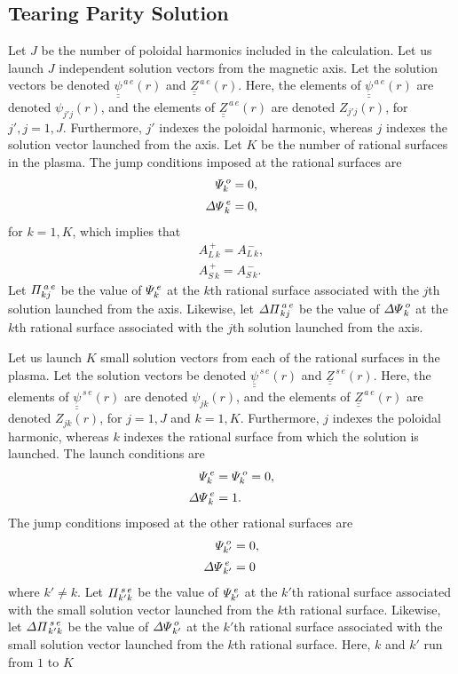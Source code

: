 \documentclass[12pt,prb,aps,notitlepage]{revtex4-1}
\begin{document}
\subsection{Tearing Parity Solution}
Let $J$ be the number of poloidal harmonics included in the calculation. 
Let us launch $J$ independent solution vectors from the magnetic axis.
Let the  solution vectors be denoted $\underline{\underline{\psi}}^{\,a\,e}(r)$ and $\underline{\underline{Z}}^{\,a\,e}(r)$. Here, the elements of $\underline{\underline{\psi}}^{\,a\,e}(r)$ are denoted $\psi_{j'j}(r)$, and the elements of  
$\underline{\underline{Z}}^{\,a\,e}(r)$ are denoted $Z_{j'j}(r)$, for $j',j = 1, J$.  Furthermore, $j'$ indexes the poloidal
harmonic, whereas $j$ indexes the solution vector launched from the axis. Let  $K$ be the number of rational surfaces in the plasma.
The jump conditions imposed at the rational surfaces are
\begin{align}
{\mit\Psi}_k^{\,o} &= 0,\\[0.5ex]
{\mit\Delta\Psi}_k^{\,e} &= 0,
\end{align}
for $k=1,K$, which implies that
\begin{align}
A_{L\,k}^{\,+} = A_{L\,k}^{\,-},\\[0.5ex]
A_{S\,k}^{\,+} = A_{S\,k}^{\,-}.
\end{align}
Let ${\mit\Pi}_{kj}^{\,a\,e}$ be the value of ${\mit\Psi}_{k}^{\,e}$ at the $k$th rational surface associated with the $j$th solution launched from the axis. Likewise, let ${\mit\Delta\Pi}_{kj}^{\,a\,e}$ be the value of ${\mit\Delta\Psi}_{k}^{\,o}$
at the $k$th rational surface  associated with the $j$th solution launched from the axis. 

Let us launch $K$ small solution vectors from each of the  rational surfaces in the plasma. Let the solution vectors  be denoted  $\underline{\underline{\psi}}^{\,s\,e}(r)$ and $\underline{\underline{Z}}^{\,s\,e}(r)$. 
Here, the elements of $\underline{\underline{\psi}}^{\,s\,e}(r)$ are  denoted $\psi_{jk}(r)$, and the elements of  
$\underline{\underline{Z}}^{\,a\,e}(r)$ are denoted $Z_{jk}(r)$, for $j = 1, J$ and $k=1,K$. Furthermore, $j$ indexes the poloidal
harmonic, whereas $k$ indexes the rational surface from which the solution is launched. The launch conditions are
\begin{align}
{\mit\Psi}_k^{\,e} &= {\mit\Psi}_k^{\,o} = 0,\\[0.5ex]
{\mit\Delta\Psi}_k^{\,e}& = 1.
\end{align}
The jump conditions  imposed at the other rational surfaces are
\begin{align}
{\mit\Psi}_{k'}^{\,o} &= 0,\\[0.5ex]
{\mit\Delta\Psi}_{k'}^{\,e} &= 0
\end{align}
where $k'\neq k$. 
Let ${\mit\Pi}_{k'k}^{\,s\,e}$ be the value of ${\mit\Psi}_{k'}^{\,e}$ at the $k'$th rational surface associated with the small solution vector launched from the $k$th rational
surface. Likewise, let ${\mit\Delta\Pi}_{k'k}^{\,s\,e}$ be the value of ${\mit\Delta\Psi}_{k'}^{\,o}$
at the $k'$th rational surface  associated with the small solution vector launched from the $k$th rational
surface. Here, $k$ and $k'$ run from $1$ to $K$
\end{document}
